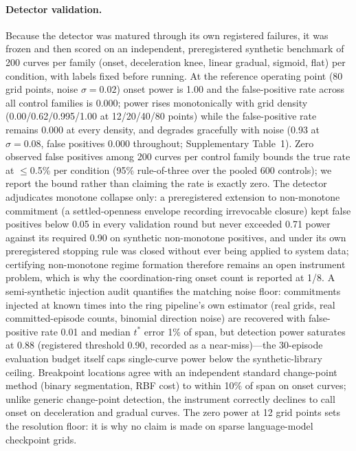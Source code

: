 \documentclass[11pt]{article}
\begin{document}
\paragraph{Detector validation.}
Because the detector was matured through its own registered failures, it
was frozen and then scored on an independent, preregistered synthetic
benchmark of 200 curves per family (onset, deceleration knee, linear
gradual, sigmoid, flat) per condition, with labels fixed before running.
At the reference operating point (80 grid points, noise
$\sigma=0.02$) onset power is 1.00 and the false-positive rate across
all control families is 0.000; power rises monotonically with grid
density (0.00/0.62/0.995/1.00 at 12/20/40/80 points) while the
false-positive rate remains 0.000 at every density, and degrades
gracefully with noise (0.93 at $\sigma=0.08$, false positives 0.000
throughout; Supplementary Table~1). Zero observed false positives among 200 curves per control
family bounds the true rate at $\leq$0.5\% per condition (95\%
rule-of-three over the pooled 600 controls); we report the bound rather
than claiming the rate is exactly zero. The detector adjudicates
monotone collapse only: a preregistered extension to non-monotone
commitment (a settled-openness envelope recording irrevocable closure)
kept false positives below 0.05 in every validation round but never
exceeded 0.71 power against its required 0.90 on synthetic
non-monotone positives, and under its own preregistered stopping rule
was closed without ever being applied to system data; certifying
non-monotone regime formation therefore remains an open instrument
problem, which is why the coordination-ring onset count is reported at
1/8. A semi-synthetic injection audit quantifies the matching noise
floor: commitments injected at known times into the ring pipeline's
own estimator (real grids, real committed-episode counts, binomial
direction noise) are recovered with false-positive rate 0.01 and
median $t^{*}$ error 1\% of span, but detection power saturates at
0.88 (registered threshold 0.90, recorded as a near-miss)---the
30-episode evaluation budget itself caps single-curve power below the
synthetic-library ceiling. Breakpoint locations agree with an independent standard
change-point method (binary segmentation, RBF cost) to within 10\% of
span on onset curves; unlike generic change-point detection, the
instrument correctly declines to call onset on deceleration and gradual
curves. The zero power at 12 grid points sets the resolution floor:
it is why no claim is made on sparse language-model checkpoint grids.
\end{document}
